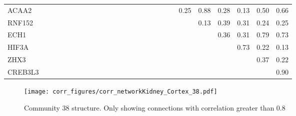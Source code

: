 \begin{longtable}{lrrrrrrrrrrrrrrrrrrrrrrrrr}
ACAA2    &              &             &             &             &                &             &               &             &            &             &            &           &             &              &            &               &              &            &             &         0.25 &       0.88 &        0.28 &       0.13 &          0.50 &         0.66 \\
RNF152   &              &             &             &             &                &             &               &             &            &             &            &           &             &              &            &               &              &            &             &              &       0.13 &        0.39 &       0.31 &          0.24 &         0.25 \\
ECH1     &              &             &             &             &                &             &               &             &            &             &            &           &             &              &            &               &              &            &             &              &            &        0.36 &       0.31 &          0.79 &         0.73 \\
HIF3A    &              &             &             &             &                &             &               &             &            &             &            &           &             &              &            &               &              &            &             &              &            &             &       0.73 &          0.22 &         0.13 \\
ZHX3     &              &             &             &             &                &             &               &             &            &             &            &           &             &              &            &               &              &            &             &              &            &             &            &          0.37 &         0.22 \\
CREB3L3  &              &             &             &             &                &             &               &             &            &             &            &           &             &              &            &               &              &            &             &              &            &             &            &               &         0.90 \\
\end{longtable}


\begin{figure}[h!]
\centering
\texttt{[image: corr\_figures/corr\_networkKidney\_Cortex\_38.pdf]}
\caption{Community 38 structure. Only showing connections with correlation greater than 0.8}
\end{figure}




